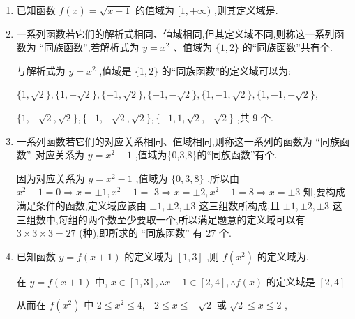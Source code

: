 \begin{enumerate}
\begin{jieda}
        联立两式，消去$f(1-x)$可得: $f\left( x\right)  = {4x} - \dfrac{8}{5}$
    \end{jieda}
    \item 已知函数 $f\left( x\right)  = \sqrt{x - 1}$ 的值域为 $\lbrack 1, + \infty )$ ,则其定义域是.
    \item 一系列函数若它们的解析式相同、值域相同,但其定义域不同,则称这一系列函数为 “同族函数”,若解析式为 $y = {x}^{2}$ 、值域为 $\{ 1,2\}$ 的“同族函数”共有个.
    \begin{jieda}
        与解析式为 $y = {x}^{2}$ ,值域是 $\{ 1,2\}$ 的“同族函数”的定义域可以为:
        
        $\{ 1,\sqrt{2}\} ,\{ 1, - \sqrt{2}\} ,\{  - 1,\sqrt{2}\} ,\{  - 1, - \sqrt{2}\} ,\{ 1, - 1,\sqrt{2}\} ,\{ 1, - 1, - \sqrt{2}\} ,$
        
        $\{ 1, - \sqrt{2},\sqrt{2}\} ,\{  - 1, - \sqrt{2},\sqrt{2}\} ,\{  - 1,1,\sqrt{2}, - \sqrt{2}\}$ ,共 9 个.
    \end{jieda}
    \item 一系列函数若它们的对应关系相同、值域相同,则称这一系列的函数为 “同族函数”. 对应关系为 $y = {x}^{2} - 1$ ,值域为\{0,3,8\}的“同族函数”有个.
    \begin{jieda}
        因为对应关系为 $y = {x}^{2} - 1$ ,值域为 $\{ 0,3,8\}$ ,所以由 ${x}^{2} - 1 = 0 \Longrightarrow  x =  \pm  1,{x}^{2} - 1 =$  $3 \Longrightarrow  x =  \pm  2,{x}^{2} - 1 = 8 \Longrightarrow  x =  \pm  3$ 知,要构成满足条件的函数,定义域应该由 $\pm  1, \pm  2, \pm  3$ 这三组数所构成,且 $\pm  1, \pm  2, \pm  3$ 这三组数中,每组的两个数至少要取一个,所以满足题意的定义域可以有 $3 \times  3 \times  3 = {27}$ (种),即所求的 “同族函数” 有 27 个.
    \end{jieda}
    \item 已知函数 $y = f\left( {x + 1}\right)$ 的定义域为 $\left\lbrack  {1,3}\right\rbrack$ ,则 $f\left( {x}^{2}\right)$ 的定义域为.
    \begin{jieda}
        在 $y = f\left( {x + 1}\right)$ 中, $x \in  \left\lbrack  {1,3}\right\rbrack  ,\therefore x + 1 \in  \left\lbrack  {2,4}\right\rbrack  ,\therefore f\left( x\right)$ 的定义域是 $\left\lbrack  {2,4}\right\rbrack$
        
        从而在 $f\left( {x}^{2}\right)$ 中 $2 \leq  {x}^{2} \leq  4, - 2 \leq  x \leq   - \sqrt{2}$ 或 $\sqrt{2} \leq  x \leq  2$ ,
        

\end{jieda}
\end{enumerate}
